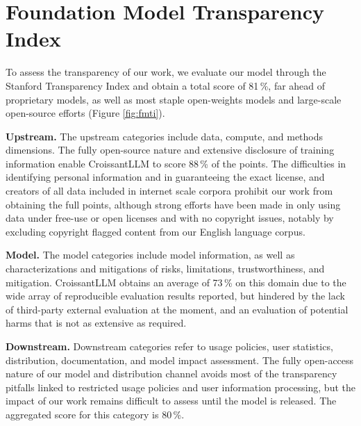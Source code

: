 \section{Foundation Model Transparency Index \label{sec:croissant:transparency}}
To assess the transparency of our work, we evaluate our model through the Stanford Transparency Index  and obtain a total score of 81\,\%, far ahead of proprietary models, as well as most staple open-weights models and large-scale open-source efforts (Figure \ref{fig:fmti}).



\textbf{Upstream.} The upstream categories include data, compute, and methods dimensions. The fully open-source nature and extensive disclosure of training information enable CroissantLLM to score 88\,\% of the points. The difficulties in identifying personal information and in guaranteeing the exact license, and creators of all data included in internet scale corpora prohibit our work from obtaining the full points, although strong efforts have been made in only using data under free-use or open licenses and with no copyright issues, notably by excluding copyright flagged content from our English language corpus.

\textbf{Model.} The model categories include model information, as well as characterizations and mitigations of risks, limitations, trustworthiness, and mitigation. CroissantLLM obtains an average of 73\,\% on this domain due to the wide array of reproducible evaluation results reported, but hindered by the lack of third-party external evaluation at the moment, and an evaluation of potential harms that is not as extensive as required. 

\textbf{Downstream.} Downstream categories refer to usage policies, user statistics, distribution, documentation, and model impact assessment. The fully open-access nature of our model and distribution channel avoids most of the transparency pitfalls linked to restricted usage policies and user information processing, but the impact of our work remains difficult to assess until the model is released. The aggregated score for this category is 80\,\%.

